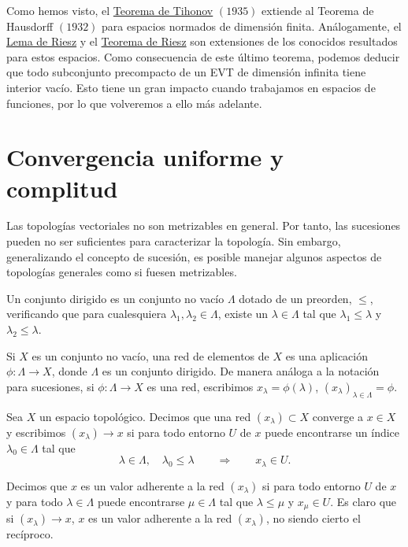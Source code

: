 Como hemos visto, el \hyperref[thm:d05]{Teorema de Tihonov} $(1935)$ extiende al Teorema de Hausdorff $(1932)$ para espacios normados de dimensión finita. Análogamente, el \hyperref[lm:d01]{Lema de Riesz} y el \hyperref[thm:d04]{Teorema de Riesz} son extensiones de los conocidos resultados para estos espacios. Como consecuencia de este último teorema, podemos deducir que todo subconjunto precompacto de un EVT de dimensión infinita tiene interior vacío. Esto tiene un gran impacto cuando trabajamos en espacios de funciones, por lo que volveremos a ello más adelante. 

\section{Convergencia uniforme y complitud}
Las topologías vectoriales no son metrizables en general. Por tanto, las sucesiones pueden no ser suficientes para caracterizar la topología. Sin embargo, generalizando el concepto de sucesión, es posible manejar algunos aspectos de topologías generales como si fuesen metrizables. 

\begin{definicion}
Un conjunto dirigido es un conjunto no vacío $\Lambda$ dotado de un preorden, $\leq$, verificando que para cualesquiera $\lambda_{1},\lambda_{2}\in\Lambda$, existe un $\lambda\in\Lambda$ tal que $\lambda_{1}\leq\lambda$ y $\lambda_{2}\leq\lambda$.

Si $X$ es un conjunto no vacío, una red de elementos de $X$ es una aplicación $\phi : \Lambda \rightarrow X$, donde $\Lambda$ es un conjunto dirigido. De manera análoga a la notación para sucesiones, si $\phi: \Lambda \rightarrow X$ es una red, escribimos $x_{\lambda} = \phi(\lambda)$, $(x_{\lambda})_{\lambda\in\Lambda} = \phi$. 
\end{definicion}

\begin{definicion}
Sea $X$ un espacio topológico. Decimos que una red $(x_{\lambda})\subset X$ converge a $x\in X$ y escribimos $(x_{\lambda}) \rightarrow x$ si para todo entorno $U$ de $x$ puede encontrarse un índice $\lambda_{0}\in\Lambda$ tal que 
\begin{equation}
\lambda\in\Lambda, \quad \lambda_{0}\leq\lambda \qquad \Rightarrow \qquad  x_{\lambda}\in U.
\end{equation}
\end{definicion}

\begin{definicion}
Decimos que $x$ es un valor adherente a la red $(x_\lambda)$ si para todo entorno $U$ de $x$ y para todo $\lambda\in\Lambda$ puede encontrarse $\mu \in \Lambda$ tal que $\lambda\leq\mu$ y $x_{\mu}\in U$. Es claro que si $(x_{\lambda}) \rightarrow x$,
$x$ es un valor adherente a la red $(x_{\lambda})$, no siendo cierto el recíproco.
\end{definicion}

